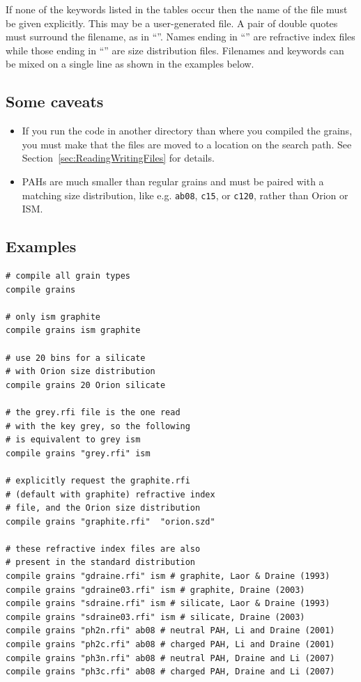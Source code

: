   If none of the keywords
listed in the tables
occur then the name of the file must be given explicitly.
This may be a user-generated file.
A pair of double quotes must
surround the filename, as in ``''.
Names ending in
``'' are
refractive index files while those ending in ``''
are size distribution files.
Filenames and keywords can be mixed on a single line as shown in
the examples below.

\subsection{Some caveats}

\begin{itemize}

\item
  If you run the code in another directory than where you compiled the grains,
  you must make that the files are moved to a location on the search path.
  See Section~\ref{sec:ReadingWritingFiles} for details.

\item 
PAHs are much smaller than regular grains and must be paired with a
matching size distribution, like e.g. \texttt{ab08}, \texttt{c15}, or \texttt{c120}, rather than Orion or ISM.
\end{itemize}

\subsection{Examples}
\begin{verbatim}
# compile all grain types
compile grains

# only ism graphite
compile grains ism graphite

# use 20 bins for a silicate
# with Orion size distribution
compile grains 20 Orion silicate

# the grey.rfi file is the one read
# with the key grey, so the following
# is equivalent to grey ism
compile grains "grey.rfi" ism

# explicitly request the graphite.rfi
# (default with graphite) refractive index
# file, and the Orion size distribution
compile grains "graphite.rfi"  "orion.szd"

# these refractive index files are also
# present in the standard distribution
compile grains "gdraine.rfi" ism # graphite, Laor & Draine (1993)
compile grains "gdraine03.rfi" ism # graphite, Draine (2003)
compile grains "sdraine.rfi" ism # silicate, Laor & Draine (1993)
compile grains "sdraine03.rfi" ism # silicate, Draine (2003)
compile grains "ph2n.rfi" ab08 # neutral PAH, Li and Draine (2001)
compile grains "ph2c.rfi" ab08 # charged PAH, Li and Draine (2001)
compile grains "ph3n.rfi" ab08 # neutral PAH, Draine and Li (2007)
compile grains "ph3c.rfi" ab08 # charged PAH, Draine and Li (2007)
\end{verbatim}

